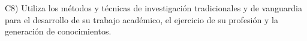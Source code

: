 C8) Utiliza los m\'{e}todos y t\'{e}cnicas de investigaci\'{o}n tradicionales y de
vanguardia para el desarrollo de su trabajo acad\'{e}mico, el ejercicio de
su profesi\'{o}n y la generaci\'{o}n de conocimientos.
